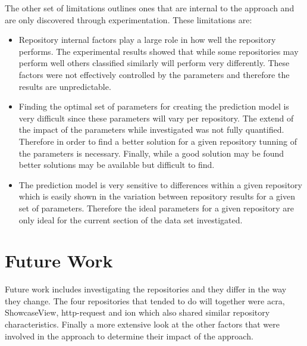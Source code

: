 The other set of limitations outlines ones that are internal to the approach and are only discovered through experimentation. These limitations are:
\begin{itemize}
\item Repository internal factors play a large role in how well the repository performs. The experimental results showed that while some repositories may perform well others classified similarly will perform very differently. These factors were not effectively controlled by the parameters and therefore the results are unpredictable.
\item Finding the optimal set of parameters for creating the prediction model is very difficult since these parameters will vary per repository. The extend of the impact of the parameters while investigated was not fully quantified. Therefore in order to find a better solution for a given repository tunning of the parameters is necessary. Finally, while a good solution may be found better solutions may be available but difficult to find.
\item The prediction model is very sensitive to differences within a given repository which is easily shown in the variation between repository results for a given set of parameters. Therefore the ideal parameters for a given repository are only ideal for the current section of the data set investigated.
\end{itemize}

\section{Future Work}

Future work includes investigating the repositories and they differ in the way they change. The four repositories that tended to do will together were acra, ShowcaseView, http-request and ion which also shared similar repository characteristics. Finally a more extensive look at the other factors that were involved in the approach to determine their impact of the approach.

